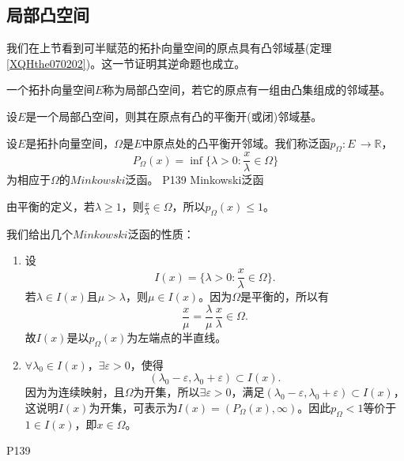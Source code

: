 \subsection{局部凸空间}
\hspace{2em}我们在上节看到可半赋范的拓扑向量空间的原点具有凸邻域基(定理\ref{XQHthe070202})。这一节证明其逆命题也成立。

\begin{proposition}
	一个拓扑向量空间$E$称为局部凸空间，若它的原点有一组由凸集组成的邻域基。
\end{proposition}

\begin{theorem}
	设$E$是一个局部凸空间，则其在原点有凸的平衡开(或闭)邻域基。
\end{theorem}

\original
{
	设$E$是拓扑向量空间，$\Omega$是$E$中原点处的凸平衡开邻域。我们称泛函$p_{\Omega}:E\, \rightarrow \mathbb{R} $，
	\begin{equation*}
		P_{\Omega}(x)=\inf\{\lambda >0:\frac{x}{\lambda}\in \Omega\}
	\end{equation*}
	为相应于$\Omega $的$Minkowski$泛函。
}
{P139 Minkowski泛函}
\begin{remark}
	由平衡的定义，若$\lambda \geq 1 $，则$\frac{x}{\lambda} \in \Omega $，所以$ p_{\Omega}(x)\leq 1$。
\end{remark}

\original
{
	我们给出几个$Minkowski$泛函的性质：
	\begin{enumerate}
		\item 设
		\begin{equation*}
			I(x)=\{\lambda>0:\frac{x}{\lambda}\in \Omega\}.
		\end{equation*}
	若$\lambda\in I(x) $且$\mu >\lambda $，则$\mu \in I(x) $。因为$\Omega $是平衡的，所以有
	\begin{equation*}
		\frac{x}{\mu}=\frac{\lambda}{\mu}\, \frac{x}{\lambda}\in \Omega.
	\end{equation*}
	故$I(x) $是以$p_{\Omega}(x) $为左端点的半直线。
	
	\item $\forall \lambda_{0}\in I(x) $，$\exists \varepsilon>0 $，使得
	\begin{equation*}
		(\lambda_{0}-\varepsilon,\lambda_{0}+\varepsilon)\subset I(x).
	\end{equation*}
	因为为连续映射，且$\Omega $为开集，所以$\exists \varepsilon>0 $，满足$(\lambda_{0}-\varepsilon,\lambda_{0}+\varepsilon ) \subset I(x)$，这说明$I(x) $为开集，可表示为$I(x)=(P_{\Omega}(x),\infty) $。因此$p_{\Omega}<1 $等价于$1\in I(x) $，即$x\in \Omega $。
	\end{enumerate}
}
{P139}

